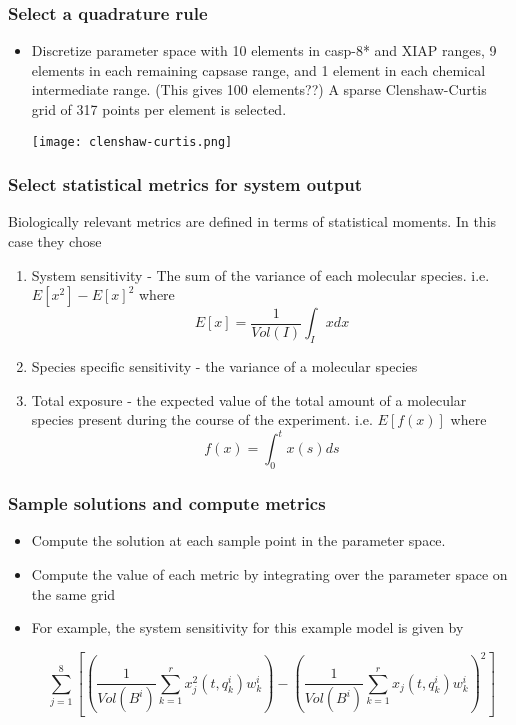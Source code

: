 \documentclass{beamer}
\theoremstyle{plain}
\theoremstyle{definition}
\begin{document}
\begin{frame}\frametitle{Select a quadrature rule}
 \begin{itemize}
  \item Discretize parameter space with 10 elements in casp-8* and XIAP ranges, 9 elements in each remaining capsase range, and 1 element in each chemical intermediate range. (This gives 100 elements??)  A sparse Clenshaw-Curtis grid of 317 points per element is selected.
  \begin{center}
   \texttt{[image: clenshaw-curtis.png]}
  \end{center}
 \end{itemize}
\end{frame}

\begin{frame}\frametitle{Select statistical metrics for system output}
 Biologically relevant metrics are defined in terms of statistical moments. In this case they chose
 \begin{enumerate}
  \item System sensitivity - The sum of the variance of each molecular species. i.e. $E[x^2] - E[x]^2$ where
  \begin{equation}
   E[x] = \frac{1}{Vol(I)}\int_I{xdx}
  \end{equation}
  \item Species specific sensitivity - the variance of a molecular species
  \item Total exposure - the expected value of the total amount of a molecular species present during the course of the experiment. i.e. $E[f(x)]$ where
  \begin{equation*}
   f(x) = \int_0^t{x(s)ds}
  \end{equation*}
 \end{enumerate}
\end{frame}

\begin{frame}\frametitle{Sample solutions and compute metrics}
 \begin{itemize}
  \item Compute the solution at each sample point in the parameter space.
  \item Compute the value of each metric by integrating over the parameter space on the same grid
  \item For example, the system sensitivity for this example model is given by

  \begin{equation*}
   \sum_{j=1}^8\left[{\left(\frac{1}{Vol(B^i)}\sum_{k=1}^r{x^2_j(t,q_k^i)w_k^i}\right) - \left(\frac{1}{Vol(B^i)}\sum_{k=1}^r{x_j(t,q_k^i)w_k^i}\right)^2}\right]
  \end{equation*}
 \end{itemize}
\end{frame}
\end{document}
